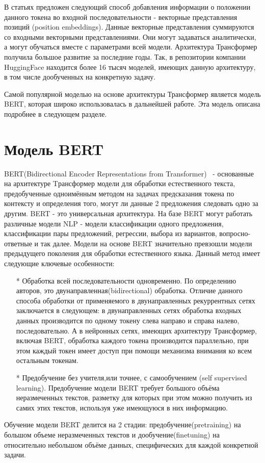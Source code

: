 В статьях \cite{devlin_2018,gehring_2017,vaswani_2017} предложен следующий способ добавления информации о положении данного токена во входной последовательности - векторные представления позиций (position embeddings). Данные векторные представления суммируются со входными векторными представлениями. Они могут задаваться аналитически, а могут обучаться вместе с параметрами всей модели.
Архитектура Трансформер получила большое развитие за последние годы. Так, в репозитории компании HuggingFace \cite{na_website_ndaa} находится более 16 тысяч моделей, имеющих данную архитектуру, в том числе дообученных на конкретную задачу. 

Самой популярной моделью на основе архитектуры Трансформер является модель BERT, которая широко использовалась в дальнейшей работе. Эта модель описана подробнее в следующем разделе. 

\section{Модель BERT}

BERT(Bidirectional Encoder Representations from Transformer)~\cite{devlin_2018} - основанные на архитектуре Tрансформер модели для обработки естественного текста, предобученные одноимённым методом на задачах предсказания токена по контексту и определения того, могут ли данные 2 предложения следовать одно за другим. BERT - это универсальная архитектура. На базе BERT могут работать различные модели NLP - модели классификации одного предложения, классификации пары предложений, регрессии, выбора из вариантов, вопросно-ответные и так далее. Модели на основе BERT значительно превзошли модели предыдущего поколения для обработки естественного языка. 
Данный метод имеет следующие ключевые особенности:
\begin{itemize}
\item[*] Обработка всей последовательности одновременно. По определению авторов, это двунаправленная(bidirectional) обработка. Отличие данного способа обработки от применяемого в двунаправленных рекуррентных сетях заключается в следующем: в двунаправленных сетях обработка входных данных производится по одному токену слева направо и справа налево, последовательно. А в нейронных сетях, имеющих архитектуру Трансформер, включая BERT, обработка каждого токена производится параллельно, при этом каждый токен имеет доступ при помощи механизма внимания ко всем остальным токенам. 
\item[*] Предобучение без учителя,или точнее, с самообучением (self supervised learning). Предобучение модели BERT требует большого объёма неразмеченных текстов, разметку для которых при этом можно получить из самих этих текстов, используя уже имеющуюся в них информацию.
\end{itemize}
Обучение модели BERT делится на 2 стадии: предобучение(pretraining) на большом объеме неразмеченных текстов и дообучение(finetuning) на относительно небольшом объёме данных, специфических для каждой конкретной задачи. 

